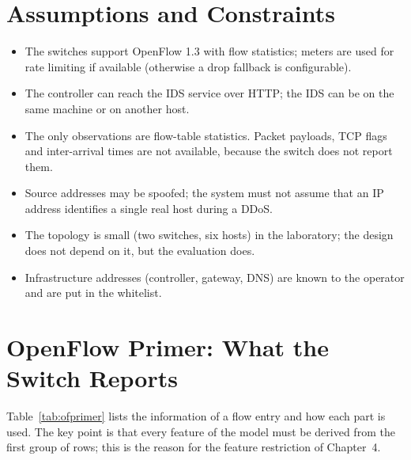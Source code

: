 \section{Assumptions and Constraints}
\begin{itemize}
	\item The switches support OpenFlow 1.3 with flow statistics; meters are used for rate limiting if available (otherwise a drop fallback is configurable).
	\item The controller can reach the IDS service over HTTP; the IDS can be on the same machine or on another host.
	\item The only observations are flow-table statistics. Packet payloads, TCP flags and inter-arrival times are not available, because the switch does not report them.
	\item Source addresses may be spoofed; the system must not assume that an IP address identifies a single real host during a DDoS.
	\item The topology is small (two switches, six hosts) in the laboratory; the design does not depend on it, but the evaluation does.
	\item Infrastructure addresses (controller, gateway, DNS) are known to the operator and are put in the whitelist.
\end{itemize}

\section{OpenFlow Primer: What the Switch Reports}
Table~\ref{tab:ofprimer} lists the information of a flow entry and how each part is used. The key point is that every feature of the model must be derived from the first group of rows; this is the reason for the feature restriction of Chapter~4.

